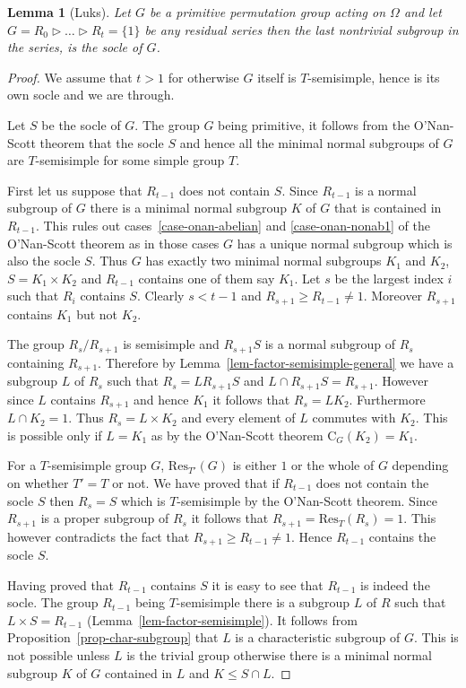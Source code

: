 \documentclass[11pt]{madras}%
\newtheorem{lemma}[theorem]{Lemma}
\theoremstyle{remark}
\newcommand{\Residue}[2][]{{\ensuremath{\mathrm{Res}_{{#1}}\left(#2\right)}}}
\newcommand{\Cent}[2][]{\ensuremath{\mathrm{C}_{#1}({#2})}}
\begin{document}
\begin{lemma}[Luks]\label{lem-smallest}
  Let $G$ be a primitive permutation group acting on $\Omega$ and let
  $G = R_0 \rhd \ldots \rhd R_t = \{ 1 \}$ be any residual series then
  the last nontrivial subgroup in the series, is the socle of $G$.
\end{lemma}
\begin{proof}
  We assume that $t>1$ for otherwise $G$ itself is $T$-semisimple,
  hence is its own socle and we are through.

  Let $S$ be the socle of $G$.  The group $G$ being primitive, it
  follows from the O'Nan-Scott theorem that the socle $S$ and hence
  all the minimal normal subgroups of $G$ are $T$-semisimple for some
  simple group $T$.  

  First let us suppose that $R_{t-1}$ does not contain $S$.  Since
  $R_{t-1}$ is a normal subgroup of $G$ there is a minimal normal
  subgroup $K$ of $G$ that is contained in $R_{t-1}$. This rules out
  cases~\ref{case-onan-abelian} and \ref{case-onan-nonab1} of the
  O'Nan-Scott theorem as in those cases $G$ has a unique normal
  subgroup which is also the socle $S$.  Thus $G$ has exactly two
  minimal normal subgroups $K_1$ and $K_2$, $S = K_1 \times K_2$ and
  $R_{t-1}$ contains one of them say $K_1$.  Let $s$ be the largest
  index $i$ such that $R_i$ contains $S$. Clearly $s < t - 1$ and
  $R_{s+1} \geq R_{t-1} \neq 1$.  Moreover $R_{s+1}$ contains $K_1$
  but not $K_2$.

  The group $R_s/R_{s+1}$ is semisimple and $R_{s+1}S$ is a normal
  subgroup of $R_s$ containing $R_{s+1}$. Therefore by
  Lemma~\ref{lem-factor-semisimple-general} we have a subgroup $L$ of
  $R_s$ such that $R_s = L R_{s+1} S$ and $L \cap R_{s+1}S = R_{s+1}$.
  However since $L$ contains $R_{s+1} $ and hence $K_1$ it follows
  that $R_s = L K_2$.  Furthermore $L \cap K_2 = 1$. Thus $R_s = L
  \times K_2$ and every element of $L$ commutes with $K_2$. This is
  possible only if $L = K_1$ as by the O'Nan-Scott theorem
  $\Cent[G]{K_2} = K_1$.

  For a $T$-semisimple group $G$, $\Residue[T']{G}$ is either $1$ or
  the whole of $G$ depending on whether $T'= T$ or not.  We have
  proved that if $R_{t-1}$ does not contain the socle $S$ then $R_s =
  S$ which is $T$-semisimple by the O'Nan-Scott theorem. Since
  $R_{s+1}$ is a proper subgroup of $R_s$ it follows that $R_{s+1} =
  \Residue[T]{R_s} = 1$. This however contradicts the fact that
  $R_{s+1} \geq R_{t-1} \neq 1$. Hence $R_{t-1}$ contains the socle
  $S$.

  Having proved that $R_{t-1}$ contains $S$ it is easy to see that
  $R_{t-1}$ is indeed the socle. The group $R_{t-1}$ being
  $T$-semisimple there is a subgroup $L$ of $R$ such that $L \times S
  = R_{t-1}$ (Lemma~\ref{lem-factor-semisimple}). It follows from
  Proposition~\ref{prop-char-subgroup} that $L$ is a characteristic
  subgroup of $G$. This is not possible unless $L$ is the trivial
  group otherwise there is a minimal normal subgroup $K$ of $G$
  contained in $L$ and $K \leq S \cap L $.
  
\end{proof}
\end{document}
